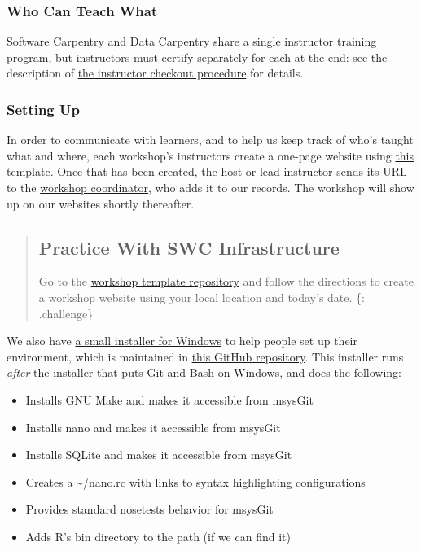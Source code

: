 \subsubsection{Who Can Teach What}\label{who-can-teach-what}

Software Carpentry and Data Carpentry share a single instructor training
program, but instructors must certify separately for each at the end:
see the description of \href{\{\{\%20page.root\%20\}\}/checkout/}{the
instructor checkout procedure} for details.

\subsubsection{Setting Up}\label{setting-up}

In order to communicate with learners, and to help us keep track of
who's taught what and where, each workshop's instructors create a
one-page website using \href{\{\{\%20site.workshop\_repo\%20\}\}}{this
template}. Once that has been created, the host or lead instructor sends
its URL to the \href{\{\{\%20site.contact\%20\}\}}{workshop
coordinator}, who adds it to our records. The workshop will show up on
our websites shortly thereafter.

\begin{quote}
\subsection{Practice With SWC
Infrastructure}\label{practice-with-swc-infrastructure}

Go to the \href{\{\{\%20site.workshop\_repo\%20\}\}}{workshop template
repository} and follow the directions to create a workshop website using
your local location and today's date. \{: .challenge\}
\end{quote}

We also have
\href{https://github.com/swcarpentry/windows-installer/releases/download/v0.3/SWCarpentryInstaller.exe}{a
small installer for Windows} to help people set up their environment,
which is maintained in
\href{https://github.com/swcarpentry/windows-installer}{this GitHub
repository}. This installer runs \emph{after} the installer that puts
Git and Bash on Windows, and does the following:

\begin{itemize}
\itemsep1pt\parskip0pt
\item
  Installs GNU Make and makes it accessible from msysGit
\item
  Installs nano and makes it accessible from msysGit
\item
  Installs SQLite and makes it accessible from msysGit
\item
  Creates a \textasciitilde{}/nano.rc with links to syntax highlighting
  configurations
\item
  Provides standard nosetests behavior for msysGit
\item
  Adds R's bin directory to the path (if we can find it)
\end{itemize}

